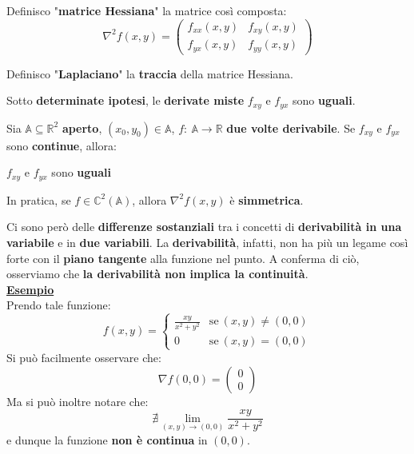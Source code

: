 \documentclass[a4paper, oneside]{article}
\newcommand\R{\mathbb{R}}
\newcommand\C{\mathbb{C}}
\newcommand\A{\mathbb{A}}
\begin{document}
    \begin{definition}
        Definisco "\textbf{matrice Hessiana}" la matrice così composta:
        \[\nabla^2 f(x,y) = \begin{pmatrix}
            f_{xx}(x,y) & f_{xy}(x,y) \\
            f_{yx}(x,y) & f_{yy}(x,y)
        \end{pmatrix}\]
    \end{definition}

    \begin{definition}
        Definisco "\textbf{Laplaciano}" la \textbf{traccia} della matrice Hessiana.
    \end{definition}

    \noindent Sotto \textbf{determinate ipotesi}, le \textbf{derivate miste} $f_{xy}$ e $f_{yx}$ sono \textbf{uguali}.

    \begin{theorem}
        Sia $\A\subseteq\R^2$ \textbf{aperto}, $(x_0,y_0)\in\A$, $f: \ \A\to\R$ \textbf{due volte derivabile}. Se $f_{xy}$ e $f_{yx}$ sono \textbf{continue}, allora:
        \begin{center}
            $f_{xy}$ e $f_{yx}$ sono \textbf{uguali}
        \end{center}
        In pratica, se $f\in\C^2(\A)$, allora $\nabla^2f(x,y)$ è \textbf{simmetrica}.
    \end{theorem}

    \noindent Ci sono però delle \textbf{differenze sostanziali} tra i concetti di \textbf{derivabilità in una variabile} e in \textbf{due variabili}. 
    La \textbf{derivabilità}, infatti, non ha più un legame così forte con il \textbf{piano tangente} alla funzione nel punto. 
    A conferma di ciò, osserviamo che \textbf{la derivabilità non implica la continuità}.\\

    \noindent \textbf{\underline{Esempio}}\\
    Prendo tale funzione:
    \[f(x,y) = \begin{cases}
        \frac{xy}{x^2+y^2} & \text{se} \ (x,y) \ne (0,0) \\
        0 & \text{se} \ (x,y) = (0,0)
    \end{cases}\]
    Si può facilmente osservare che:
    \[\nabla f(0,0) = \begin{pmatrix}
        0 \\ 0
    \end{pmatrix}\]
    Ma si può inoltre notare che:
    \[\nexists \lim_{(x,y)\to (0,0)} \frac{xy}{x^2+y^2}\]
    e dunque la funzione \textbf{non è continua} in $(0,0)$.\\
\end{document}
